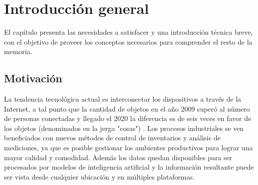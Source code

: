 
\chapter{Introducción general} %

\label{Chapter1} %
\label{IntroGeneral}


\newcommand{\keyword}[1]{\textbf{#1}}
\newcommand{\tabhead}[1]{\textbf{#1}}
\newcommand{\code}[1]{\texttt{#1}}
\newcommand{\file}[1]{\texttt{\bfseries#1}}
\newcommand{\option}[1]{\texttt{\itshape#1}}
\newcommand{\grados}{$^{\circ}$}



El capítulo presenta las necesidades a satisfacer y una introducción técnica breve, con el objetivo de proveer los conceptos necesarios para comprender el resto de la memoria.

\section{Motivación}
\label{ch1Motivacion}

La tendencia tecnológica actual es interconectar los dispositivos a través de la Internet, a tal punto que la cantidad de objetos en el año 2009 superó al número de personas conectadas y llegado el 2020 la diferencia es de seis veces en favor de los objetos (denominados en la jerga "cosas") \citep{ARTICLE:DaveEvans}.
Los procesos industriales se ven beneficiados con nuevos métodos de control de inventarios y análisis de mediciones, ya que es posible gestionar los ambientes productivos para lograr una mayor calidad y comodidad.
Además los datos quedan disponibles para ser procesados por modelos de inteligencia artificial y la información resultante puede ser vista desde cualquier ubicación y en múltiples plataformas. 

